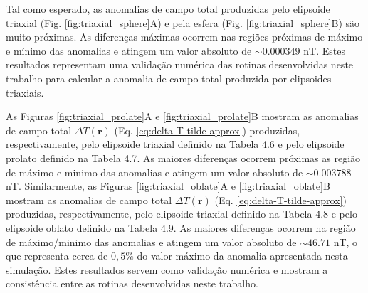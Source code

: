 Tal como esperado, as anomalias de campo total produzidas pelo elipsoide triaxial (Fig. \ref{fig:triaxial_sphere}A) e pela esfera (Fig. \ref{fig:triaxial_sphere}B) são muito próximas. As diferenças máximas ocorrem nas regiões próximas de máximo e mínimo das anomalias e atingem um valor absoluto de $\sim 0.000349$ nT. Estes resultados representam uma validação numérica das rotinas desenvolvidas neste trabalho para calcular a anomalia de campo total produzida por elipsoides triaxiais.

As Figuras \ref{fig:triaxial_prolate}A e \ref{fig:triaxial_prolate}B mostram as anomalias de campo total $\Delta T (\mathbf{r})$ (Eq. \ref{eq:delta-T-tilde-approx}) produzidas, respectivamente, pelo elipsoide triaxial definido na Tabela 4.6 e pelo elipsoide prolato definido na Tabela 4.7. As maiores diferenças ocorrem próximas as região de máximo e minimo das anomalias e atingem um valor absoluto de $\sim 0.003788$ nT. Similarmente, as Figuras \ref{fig:triaxial_oblate}A e \ref{fig:triaxial_oblate}B mostram as anomalias de campo total $\Delta T (\mathbf{r})$ (Eq. \ref{eq:delta-T-tilde-approx}) produzidas, respectivamente, pelo elipsoide triaxial definido na Tabela 4.8 e pelo elipsoide oblato definido na Tabela 4.9. As maiores diferenças ocorrem na região de máximo/minimo das anomalias e atingem um valor absoluto de $\sim 46.71$ nT, o que representa cerca de $0,5\%$ do valor máximo da anomalia apresentada nesta simulação. Estes resultados servem como validação numérica e mostram a consistência entre as rotinas desenvolvidas neste trabalho.
\newpage

